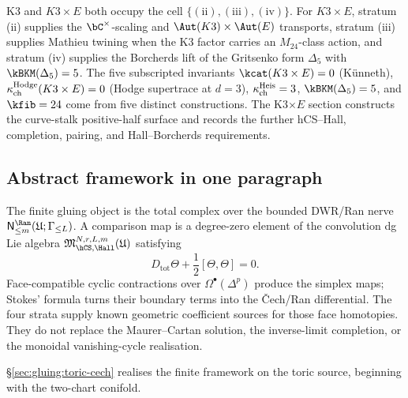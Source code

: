 \begin{remark}
\label{rem:k3e-master-case}
K3 and $K3\times E$ both occupy the cell
$\{(\text{ii}),(\text{iii}),(\text{iv})\}$. For $K3\times E$, stratum
(ii) supplies the $\bC^\times$-scaling and
$\Aut(K3)\times\Aut(E)$ transports, stratum (iii) supplies Mathieu
twining when the K3 factor carries an $M_{24}$-class action, and
stratum (iv) supplies the Borcherds lift of the Gritsenko form
$\Delta_5$ with $\kBKM(\Delta_5)=5$. The five
subscripted invariants
$\kcat(K3\times E)=0$ \textup{(}K\"unneth\textup{),}
$\kappa_{\mathrm{ch}}^{\mathrm{Hodge}}(K3 \times E)=0$ \textup{(}Hodge supertrace at $d = 3$\textup{),}
$\kappa_{\mathrm{ch}}^{\mathrm{Heis}}=3$,
$\kBKM(\Delta_5)=5$, and
$\kfib=24$ come from five distinct constructions. The K3$\times E$
section constructs the curve-stalk positive-half surface and records
the further hCS--Hall, completion, pairing, and Hall--Borcherds
requirements.
\end{remark}

\subsection{Abstract framework in one paragraph}
\label{sec:gluing:abstract:summary}

The finite gluing object is the total complex over the bounded
DWR/Ran nerve
$\mathsf N^{\Ran}_{\le m}(\mathfrak U;\Gamma_{\le L})$. A comparison
map is a degree-zero element of the convolution dg Lie algebra
$\mathfrak M_{\hCS,\Hall}^{N,r,L,m}(\mathfrak U)$ satisfying
\[
 D_{\mathrm{tot}}\Theta+\frac12[\Theta,\Theta]=0.
\]
Face-compatible cyclic contractions over $\Omega^\bullet(\Delta^p)$
produce the simplex maps; Stokes' formula turns their boundary terms
into the \v{C}ech/Ran differential. The four strata supply known
geometric coefficient sources for those face homotopies. They do not
replace the Maurer--Cartan solution, the inverse-limit completion, or
the monoidal vanishing-cycle realisation.

\S\ref{sec:gluing:toric-cech} realises the finite framework on the
toric source, beginning with the two-chart conifold.
